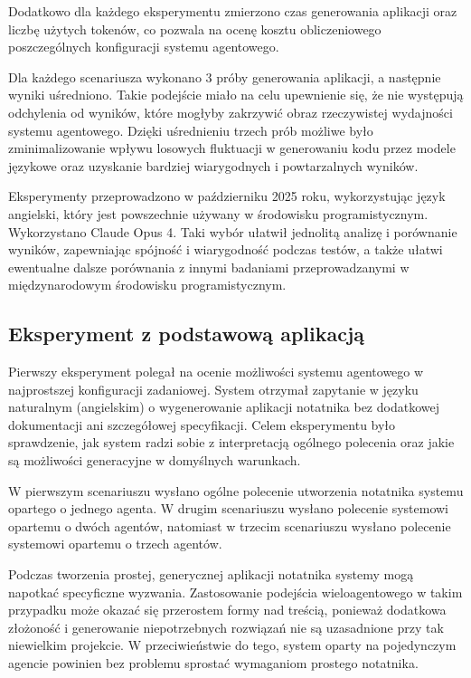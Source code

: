 Dodatkowo dla każdego eksperymentu zmierzono czas generowania aplikacji oraz liczbę użytych tokenów, co pozwala na ocenę kosztu obliczeniowego poszczególnych konfiguracji systemu agentowego.

Dla każdego scenariusza wykonano 3 próby generowania aplikacji, a następnie wyniki uśredniono. Takie podejście miało na celu upewnienie się, że nie występują odchylenia od wyników, które mogłyby zakrzywić obraz rzeczywistej wydajności systemu agentowego. Dzięki uśrednieniu trzech prób możliwe było zminimalizowanie wpływu losowych fluktuacji w generowaniu kodu przez modele językowe oraz uzyskanie bardziej wiarygodnych i powtarzalnych wyników.

Eksperymenty przeprowadzono w październiku 2025 roku, wykorzystując język angielski, który jest powszechnie używany w środowisku programistycznym. Wykorzystano Claude Opus 4. Taki wybór ułatwił jednolitą analizę i porównanie wyników, zapewniając spójność i wiarygodność podczas testów, a także ułatwi ewentualne dalsze porównania z innymi badaniami przeprowadzanymi w międzynarodowym środowisku programistycznym.

\subsection{Eksperyment z podstawową aplikacją}
Pierwszy eksperyment polegał na ocenie możliwości systemu agentowego w najprostszej konfiguracji zadaniowej. System otrzymał zapytanie w języku naturalnym (angielskim) o wygenerowanie aplikacji notatnika bez dodatkowej dokumentacji ani szczegółowej specyfikacji. Celem eksperymentu było sprawdzenie, jak system radzi sobie z interpretacją ogólnego polecenia oraz jakie są możliwości generacyjne w domyślnych warunkach.

W pierwszym scenariuszu wysłano ogólne polecenie utworzenia notatnika systemu opartego o jednego agenta. W drugim scenariuszu wysłano polecenie systemowi opartemu o dwóch agentów, natomiast w trzecim scenariuszu wysłano polecenie systemowi opartemu o trzech agentów.

Podczas tworzenia prostej, generycznej aplikacji notatnika systemy mogą napotkać specyficzne wyzwania. Zastosowanie podejścia wieloagentowego w takim przypadku może okazać się przerostem formy nad treścią, ponieważ dodatkowa złożoność i generowanie niepotrzebnych rozwiązań nie są uzasadnione przy tak niewielkim projekcie. W przeciwieństwie do tego, system oparty na pojedynczym agencie powinien bez problemu sprostać wymaganiom prostego notatnika.

